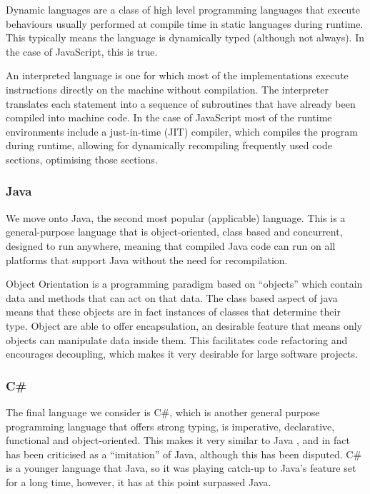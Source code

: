 \documentclass[11pt, a4paper, twocolumn, twoside]{report}
\begin{document}
Dynamic languages are a class of high level programming languages that execute behaviours usually performed at compile time in static languages during runtime. \citep{trattdyamicallytypedlanguages} This typically means the language is dynamically typed (although not always). In the case of JavaScript, this is true.

An interpreted language is one for which most of the implementations execute instructions directly on the machine without compilation. The interpreter translates each statement into a sequence of subroutines that have already been compiled into machine code. In the case of JavaScript most of the runtime environments include a just-in-time (JIT) compiler, which compiles the program during runtime, allowing for dynamically recompiling frequently used code sections, optimising those sections. \citep{aycock2003brief}

\subsubsection{Java}

We move onto Java, the second most popular (applicable) language. This is a general-purpose language that is object-oriented, class based and concurrent, \citep{gosling2014java} designed to run anywhere, meaning that compiled Java code can run on all platforms that support Java without the need for recompilation. \citep{gosling1995java}

Object Orientation is a programming paradigm based on ``objects'' which contain data and methods that can act on that data. The class based aspect of java means that these objects are in fact instances of classes that determine their type. \citep{kindler2011object} Object are able to offer encapsulation, an desirable feature that means only objects can manipulate data inside them. This facilitates code refactoring and encourages decoupling, which makes it very desirable for large software projects.

\subsubsection{C\#}

The final language we consider is C\#, which is another general purpose programming language that offers strong typing, is imperative, declarative, functional and object-oriented. This makes it very similar to Java \citep{kreft2017afterjava}, and in fact has been criticised as a ``imitation'' of Java, although this has been disputed. C\# is a younger language that Java, so it was playing catch-up to Java's feature set for a long time, however, it has at this point surpassed Java.
\end{document}
